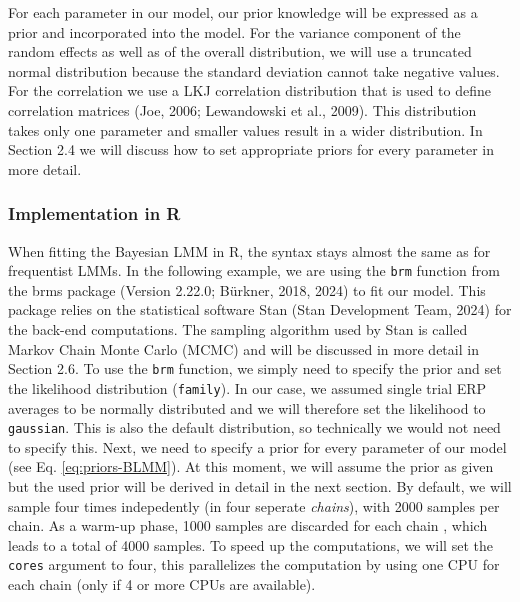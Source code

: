 \documentclass[
  doc,12pt,floatsintext]{apa7}
\begin{document}
For each parameter in our model, our prior knowledge will be expressed as a prior and incorporated into the model. For the variance component of the random effects as well as of the overall distribution, we will use a truncated normal distribution because the standard deviation cannot take negative values. For the correlation we use a LKJ correlation distribution that is used to define correlation matrices (Joe, 2006; Lewandowski et al., 2009). This distribution takes only one parameter and smaller values result in a wider distribution. In Section 2.4 we will discuss how to set appropriate priors for every parameter in more detail.

\subsubsection{Implementation in R}\label{implementation-in-r}

When fitting the Bayesian LMM in R, the syntax stays almost the same as for frequentist LMMs. In the following example, we are using the \texttt{brm} function from the brms package (Version 2.22.0; Bürkner, 2018, 2024) to fit our model. This package relies on the statistical software Stan (Stan Development Team, 2024) for the back-end computations. The sampling algorithm used by Stan is called Markov Chain Monte Carlo (MCMC) and will be discussed in more detail in Section 2.6. To use the \texttt{brm} function, we simply need to specify the prior and set the likelihood distribution (\texttt{family}). In our case, we assumed single trial ERP averages to be normally distributed and we will therefore set the likelihood to \texttt{gaussian}. This is also the default distribution, so technically we would not need to specify this. Next, we need to specify a prior for every parameter of our model (see Eq. \eqref{eq:priors-BLMM}). At this moment, we will assume the prior as given but the used prior will be derived in detail in the next section. By default, we will sample four times indepedently (in four seperate \emph{chains}), with 2000 samples per chain. As a warm-up phase, 1000 samples are discarded for each chain , which leads to a total of 4000 samples. To speed up the computations, we will set the \texttt{cores} argument to four, this parallelizes the computation by using one CPU for each chain (only if 4 or more CPUs are available).
\end{document}
